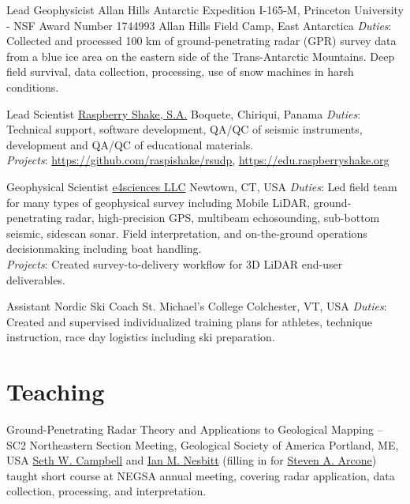 \documentclass[a4paper,12pt,sans,colorlinks]{moderncv}
\newcommand{\me}{\href{https://www.iannesbitt.org}{Ian M. Nesbitt}}
\newcommand{\seth}{\href{https://www.alpinesciences.net}{Seth W. Campbell}}
\newcommand{\stevearcone}{\href{https://engineering.dartmouth.edu/community/faculty/steven-arcone}{Steven A. Arcone}}
\newcommand{\raspishake}{\href{https://raspberryshake.org}{Raspberry Shake, S.A.}}
\newcommand{\efour}{\href{https://e4sciences.com}{e4sciences LLC}}
\begin{document}
{Lead Geophysicist}
{Allan Hills Antarctic Expedition I-165-M,
Princeton University - NSF Award Number 1744993}
{Allan Hills Field Camp, East Antarctica}
{}
{
    \emph{Duties}: Collected and processed 100 km of ground-penetrating
    radar (GPR) survey data from a blue ice area on the eastern side of the
    Trans-Antarctic Mountains. Deep field survival, data collection,
    processing, use of snow machines in harsh conditions.
}

{Lead Scientist}
{\raspishake{}}
{Boquete, Chiriqui, Panama}
{}
{
    \emph{Duties}: Technical support, software development,
    QA/QC of seismic instruments, development and QA/QC of
    educational materials.
    \\
    \emph{Projects}: \url{https://github.com/raspishake/rsudp},
    \url{https://edu.raspberryshake.org}
}

{Geophysical Scientist}
{\efour{}}
{Newtown, CT, USA}
{}
{
    \emph{Duties}: Led field team for many types of geophysical survey
    including Mobile LiDAR, ground-penetrating radar, high-precision GPS,
    multibeam echosounding, sub-bottom seismic, sidescan sonar. Field
    interpretation, and on-the-ground operations decisionmaking including
    boat handling.
    \\
    \emph{Projects}: Created survey-to-delivery workflow for 3D LiDAR
    end-user deliverables.
}

{Assistant Nordic Ski Coach}
{St. Michael's College}
{Colchester, VT, USA}
{}
{
    \emph{Duties}: Created and supervised individualized training plans
    for athletes, technique instruction, race day logistics including
    ski preparation.
}


\section{Teaching}


{Ground-Penetrating Radar Theory and Applications to Geological
Mapping -- SC2}
{Northeastern Section Meeting, Geological Society of America}
{Portland, ME, USA}
{}
{
    \seth{} and \me{} (filling in for \stevearcone{}) taught
    short course at NEGSA annual meeting, covering radar application,
    data collection, processing, and interpretation.
}
\end{document}

